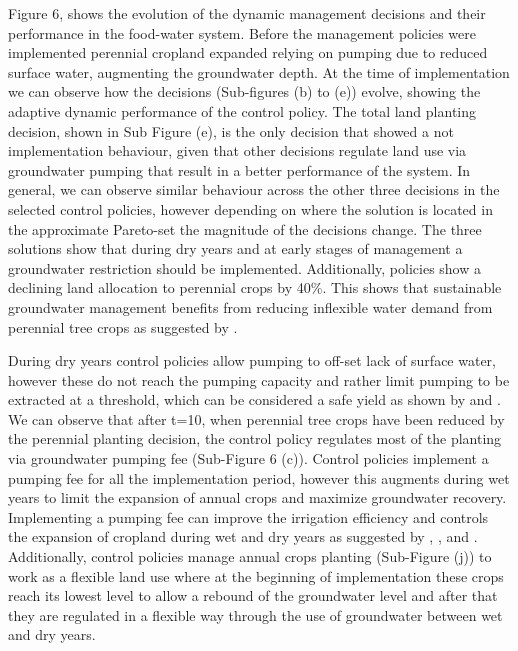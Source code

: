 \documentclass[11pt,a4paper]{article}
\begin{document}
Figure 6, shows the evolution of the dynamic management decisions and their performance in the food-water system. Before the management policies were implemented perennial cropland expanded relying on pumping due to reduced surface water, augmenting the groundwater depth. At the time of implementation we can observe how the decisions (Sub-figures (b) to (e)) evolve, showing the adaptive dynamic performance of the control policy. The total land planting decision, shown in Sub Figure (e), is the only decision that showed a not implementation behaviour, given that other decisions regulate land use via groundwater pumping that result in a better performance of the system. In general, we can observe similar behaviour across the other three decisions in the selected control policies, however depending on where the solution is located in the approximate Pareto-set the magnitude of the decisions change. The three solutions show that during dry years and at early stages of management a groundwater restriction should be implemented. Additionally, policies show a declining land allocation to perennial crops by 40\%. This shows that sustainable groundwater management benefits from reducing inflexible water demand from perennial tree crops as suggested by \textcite{qin_flexibility_2019}. 

During dry years control policies allow pumping to off-set lack of surface water, however these do not reach the pumping capacity and rather limit pumping to be extracted at a threshold, which can be considered a safe yield as shown by \textcite{miro_framework_2019} and \cite{macewan_hydroeconomic_2017}. We can observe that after t=10, when perennial tree crops have been reduced by the perennial planting decision, the control policy regulates most of the planting via groundwater pumping fee (Sub-Figure 6 (c)). Control policies implement a pumping fee for all the implementation period, however this augments during wet years to limit the expansion of annual crops and maximize groundwater recovery. Implementing a pumping fee can improve the irrigation efficiency and controls the expansion of cropland during wet and dry years as suggested by \textcite{stone_economic_2022}, \textcite{graveline_combining_2020}, and \textcite{khan_effect_2019}. Additionally, control policies manage annual crops planting (Sub-Figure (j)) to work as a flexible land use where at the beginning of implementation these crops reach its lowest level to allow a rebound of the groundwater level and after that they are regulated in a flexible way through the use of groundwater between wet and dry years. 
\end{document}
